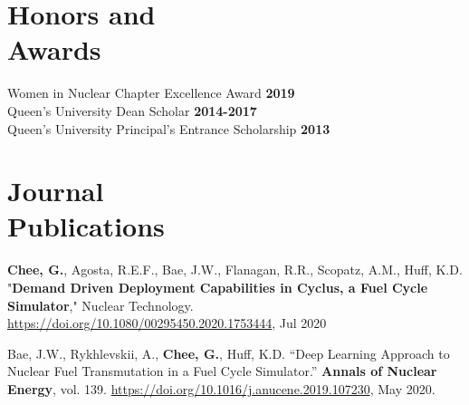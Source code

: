 \documentclass[margin,line]{resume}
\begin{document}
\begin{resume}
    \section{\mysidestyle Honors and\\Awards}
    Women in Nuclear Chapter Excellence Award \hfill \textbf{2019}\vspace{.5mm}\\%
    Queen's University Dean Scholar  \hfill \textbf{2014-2017}\vspace{.5mm}\\
    Queen's University Principal's Entrance Scholarship \hfill \textbf{2013}\hfill 


    \section{\mysidestyle Journal\\Publications}
      \begin{bibenum} 

        \item \textbf{Chee, G.}, Agosta, R.E.F., Bae, J.W., Flanagan, R.R., Scopatz, A.M., 
        Huff, K.D. "\textbf{Demand Driven Deployment Capabilities in Cyclus, a Fuel Cycle Simulator}," 
        Nuclear Technology. \url{https://doi.org/10.1080/00295450.2020.1753444}, Jul 2020
        \item Bae, J.W., Rykhlevskii, A., \textbf{Chee, G.}, Huff, K.D. ``Deep 
        Learning Approach to Nuclear Fuel Transmutation in a Fuel Cycle 
        Simulator.'' \textbf{Annals of Nuclear Energy}, vol. 139. 
        \url{https://doi.org/10.1016/j.anucene.2019.107230}, May 2020.

      \end{bibenum}

\end{resume}
\end{document}

